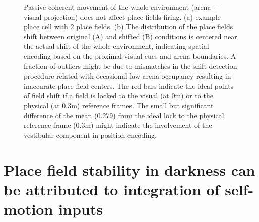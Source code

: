 \begin{figure}
\captionsetup{format=plain}
\caption[Spatial orientation relative to proximal cues]{
Passive coherent movement of the whole environment (arena + visual projection) does not affect place fields firing. (a) example place cell with 2 place fields. (b) The distribution of the place fields shift between original (A) and shifted (B) conditions is centered near the actual shift of the whole environment, indicating spatial encoding based on the proximal visual cues and arena boundaries. A fraction of outliers might be due to mismatches in the shift detection procedure related with occasional low arena occupancy resulting in inaccurate place field centers. The red bars indicate the ideal points of field shift if a field is locked to the visual (at 0m) or to the physical (at 0.3m) reference frames. The small but significant difference of the mean (0.279) from the ideal lock to the physical reference frame (0.3m) might indicate the involvement of the vestibular component in position encoding.
}
\label{fig:F16_proximal_cues_geometry}
\end{figure}


\section[Integration of self-motion inputs in darkness]{Place field stability in darkness can be attributed to integration of self-motion inputs%
              }
\label{sec:integration_of_sm_imputs}

